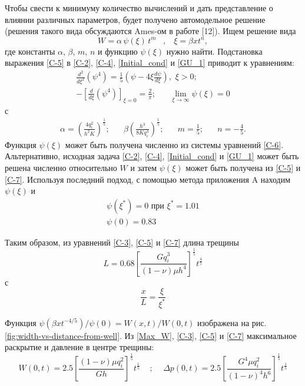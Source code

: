 \documentclass[a4paper, 12pt]{article}
\newcommand{\beq}{\begin{equation}}
\newcommand{\eeq}{\end{equation}}
\begin{document}
Чтобы свести к минимуму количество вычислений и дать представление о влиянии различных параметров, будет получено автомодельное решение (решения такого вида обсуждаются Ames-ом в работе [12]).
Ищем решение вида
\beq\label{C-5}
W=\alpha\,\psi(\xi)\,t^m\,\,\,\,\,,\,\,\,\,\,\xi=\beta xt^n,
\tag{C-5}
\eeq
где константы $\alpha$, $\beta$, $m$, $n$ и функцию $\psi(\xi)$ нужно найти.
Подстановка выражения \eqref{C-5} в \eqref{C-2}, \eqref{C-4}, \eqref{Initial_cond} и \eqref{GU_1} приводит к уравнениям:
\beq\label{C-6}
\begin{split}
\frac{d^2}{d\xi^2}\left(\psi^4\right)=\frac{1}{5}\left(\psi-4\xi\frac{d\psi}{d\xi}\right),\,\,\xi>0;\\[4pt]
-\left[\frac{d}{d\xi}\left(\psi^4\right)\right]_{\xi=0}=\frac{2}{\pi};\,\,\,\,\,\,\,\,\,\,\lim_{\xi\to\infty}{\psi(\xi)}=0
\end{split}
\tag{C-6}
\eeq
с
\beq\label{C-7}
\begin{split}
\alpha=\left(\frac{4q_i^2}{h^2K}\right)^{\!\!\frac{1}{5}};\,\,\,\,\,\,\,\,\,\,\beta\left(\frac{h^3}{8Kq_i^3}\right)^{\!\!\frac{1}{5}};\,\,\,\,\,\,\,\,\,\,m=\frac{1}{5};\,\,\,\,\,\,\,\,\,\,n=-\frac{4}{5}.
\end{split}
\tag{C-7}
\eeq
Функция $\psi(\xi)$ может быть получена численно из системы уравнений \eqref{C-6}.
Альтернативно, исходная задача \eqref{C-2}, \eqref{C-4}, \eqref{Initial_cond} и \eqref{GU_1} может быть решена численно относительно $W$ и затем $\psi(\xi)$ может быть получена из \eqref{C-5} и \eqref{C-7}.
Используя последний подход, с помощью метода приложения A находим $\psi(\xi)$ и
\beq\label{C-8}
\begin{split}
\psi(\xi^*)=0\text{ при }\xi^*=1.01\\
\psi(0)=0.83\,\,\,\,\,\,\,\,\,\,\,\,\,\,\,\,\,\,\,
\end{split}
\tag{C-8}
\eeq

Таким образом, из уравнений \eqref{C-3}, \eqref{C-5} и \eqref{C-7} длина трещины
\beq\label{C-9}
L=0.68\left[\frac{Gq_i^3}{(1-\nu)\mu h^4}\right]^{\frac{1}{5}}t^{\frac{4}{5}}
\tag{C-9}
\eeq
с
$$
\frac{x}{L}=\frac{\xi}{\xi^*}
$$

Функция $\psi(\beta xt^{-4/5})/\psi(0)=W(x,t)/W(0,t)$ изображена на рис. \ref{fig:width-vs-distance-from-well}.
Из \eqref{Max_W}, \eqref{C-3}, \eqref{C-5} и \eqref{C-7} максимальное раскрытие и давление в центре трещины:
\beq\label{C-10}
W(0,t)=2.5\left[\frac{(1-\nu)\mu q_i^2}{Gh}\right]^{\!\frac{1}{5}}t^{\frac{1}{5}}\,\,\,\,\,\,\,;\,\,\,\,\,\,\,\Delta p(0,t)=2.5\left[\frac{G^4\mu q_i^2}{(1-\nu)^4h^6}\right]^{\frac{1}{5}}t^{\frac{1}{5}}
\tag{C-10}
\eeq
\end{document}
